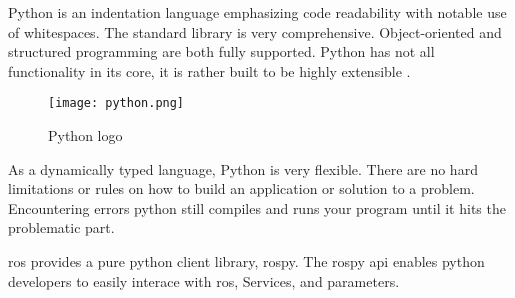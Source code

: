 
Python is an indentation language emphasizing code readability with notable use of whitespaces. 
The standard library is very comprehensive. Object-oriented and structured programming are both fully supported. 
Python has not all functionality in its core, it is rather built to be highly extensible \cite{python:wiki}.

\begin{figure}[ht]
    \centering
    \texttt{[image: python.png]}
    \caption[Python logo]{Python logo}
\end{figure}

As a dynamically typed language, Python is very flexible. There are no hard limitations or rules 
on how to build an application or solution to a problem. Encountering errors python still compiles 
and runs your program until it hits the problematic part.

\acs{ros} provides a pure python client library, rospy. The rospy \acs{api} enables python developers to easily 
interace with \acs{ros}, Services, and parameters.